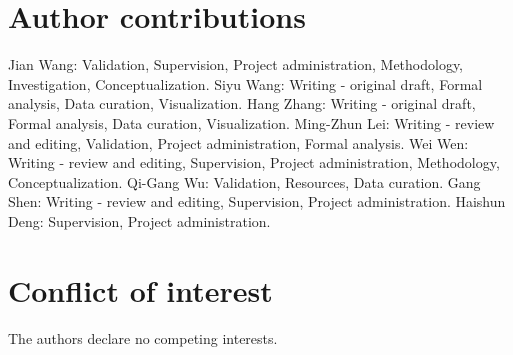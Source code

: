 \documentclass[10pt,twocolumn]{article}
\begin{document}
\section{Author contributions}

Jian Wang: Validation, Supervision, Project administration, Methodology, Investigation, Conceptualization. Siyu Wang: Writing - original draft, Formal analysis, Data curation, Visualization. Hang Zhang: Writing - original draft, Formal analysis, Data curation, Visualization. Ming-Zhun Lei: Writing - review and editing, Validation, Project administration, Formal analysis. Wei Wen: Writing - review and editing, Supervision, Project administration, Methodology, Conceptualization. Qi-Gang Wu: Validation, Resources, Data curation. Gang Shen: Writing - review and editing, Supervision, Project administration. Haishun Deng: Supervision, Project administration.


\section{Conflict of interest}

The authors declare no competing interests.






\end{document}
